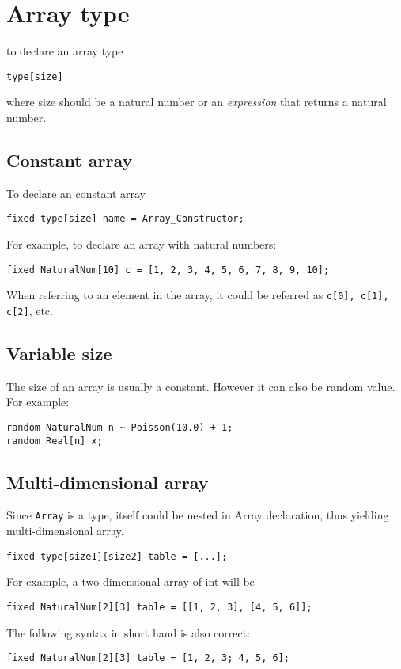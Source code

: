 \documentclass[12pt]{article}
\begin{document}
\section{Array type}
to declare an array type
\begin{verbatim}
type[size]
\end{verbatim}
 where size should be a natural number or an \emph{expression} that returns a natural number.

\subsection{Constant array}
To declare an constant array
\begin{verbatim}
fixed type[size] name = Array_Constructor;
\end{verbatim}

For example, to declare an array with natural numbers:
\begin{verbatim}
fixed NaturalNum[10] c = [1, 2, 3, 4, 5, 6, 7, 8, 9, 10];
\end{verbatim}

When referring to an element in the array, it could be referred as \texttt{c[0], c[1], c[2]}, etc.

\subsection{Variable size}
The size of an array is usually a constant. However it can also be random value.
For example:
\begin{verbatim}
random NaturalNum n ~ Poisson(10.0) + 1;
random Real[n] x;
\end{verbatim}

\subsection{Multi-dimensional array}
Since \texttt{Array} is a type, itself could be nested in Array declaration, thus yielding multi-dimensional array. 
\begin{verbatim}
fixed type[size1][size2] table = [...];
\end{verbatim}

For example, a two dimensional array of int will be
\begin{verbatim}
fixed NaturalNum[2][3] table = [[1, 2, 3], [4, 5, 6]];
\end{verbatim}
The following syntax in short hand is also correct:
\begin{verbatim}
fixed NaturalNum[2][3] table = [1, 2, 3; 4, 5, 6];
\end{verbatim}
\end{document}
